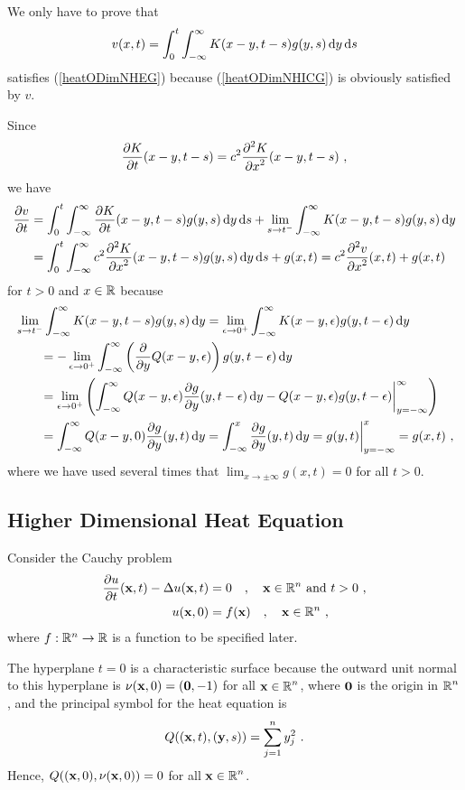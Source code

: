 We only have to prove that
\[
v(x,t) = \int_0^t \int_{-\infty}^{\infty} K(x-y,t-s) g(y,s) \dx{y}\dx{s}
\]
satisfies (\ref{heatODimNHEG}) because (\ref{heatODimNHICG}) is
obviously satisfied by $v$.

Since
\[
\pdydx{K}{t}(x-y,t-s) = c^2 \pdydxn{K}{x}{2}(x-y,t-s) \ ,
\]
we have
\begin{align*}
\pdydx{v}{t} &= \int_0^t \int_{-\infty}^{\infty}
\pdydx{K}{t}(x-y, t-s) g(y,s) \dx{y}\dx{s} 
+ \lim_{s\to t^-} \int_{-\infty}^{\infty} K(x-y,t-s)g(y,s) \dx{y} \\
& = \int_0^t \int_{-\infty}^{\infty} c^2
\pdydxn{K}{x}{2}(x-y, t-s) g(y,s) \dx{y}\dx{s} + g(x,t)
= c^2 \pdydxn{v}{x}{2}(x,t) + g(x,t)
\end{align*}
for $t>0$ and $x\in \RR$ because
\begin{align*}
& \lim_{s\to t^-} \int_{-\infty}^{\infty} K(x-y,t-s)g(y,s) \dx{y}
= \lim_{\epsilon \to 0^+} \int_{-\infty}^{\infty}
K(x-y,\epsilon)g(y,t-\epsilon) \dx{y} \\
& \qquad = -\lim_{\epsilon \to 0^+} \int_{-\infty}^{\infty}
\left(\pdfdx{Q(x-y,\epsilon)}{y}\right) g(y,t-\epsilon) \dx{y} \\
& \qquad = \lim_{\epsilon \to 0^+} \left( \int_{-\infty}^{\infty} Q(x-y,\epsilon)
\pdydx{g}{y}(y,t-\epsilon) \dx{y}
- Q(x-y,\epsilon) g(y,t-\epsilon) \bigg|_{y=-\infty}^{\infty} \right) \\
& \qquad = \int_{-\infty}^{\infty} Q(x-y,0) \pdydx{g}{y}(y,t) \dx{y}
= \int_{-\infty}^x \pdydx{g}{y}(y,t) \dx{y}
= g(y,t) \bigg|_{y=-\infty}^x = g(x,t) \ ,
\end{align*}
where we have used several times that
$\displaystyle \lim_{x\to \pm\infty} g(x,t) = 0$ for all $t>0$.

\subsection{Higher Dimensional Heat Equation}

Consider the Cauchy problem
\begin{align}
\pdydx{u}{t}(\VEC{x},t) - \Delta u(\VEC{x},t) &= 0 \quad , \quad
\VEC{x} \in \RR^n \ \text{and} \ t> 0 \ , \label{heat_cauchyA} \\
u(\VEC{x},0) &= f(\VEC{x}) \quad , \quad \VEC{x} \in \RR^n \ ,
\label{heat_cauchyB} 
\end{align}
where $f:\RR^n\rightarrow \RR$ is a function to be specified later.

\begin{rmk}
The hyperplane $t=0$ is a characteristic surface because the outward
unit normal to this hyperplane is $\VEC{\nu}(\VEC{x},0) = (\VEC{0},-1)$ for
all $\displaystyle \VEC{x} \in \RR^n$, where $\VEC{0}$ is the origin
in $\displaystyle \RR^n$, and 
the principal symbol for the heat equation is
\[
Q((\VEC{x},t), (\VEC{y},s)) = \sum_{j=1}^n y_j^2 \ .
\]
Hence, $\displaystyle Q((\VEC{x},0), \VEC{\nu}(\VEC{x},0)) = 0$ for
all $\displaystyle \VEC{x} \in \RR^n$.
\end{rmk}

